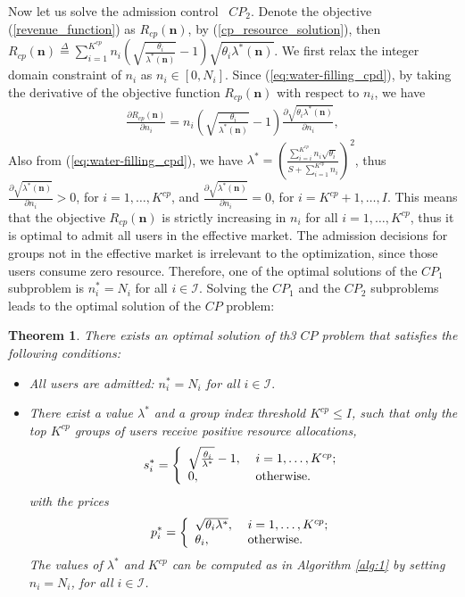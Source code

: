 \documentclass[twocolumn,10pt,twosided]{IEEEtran}
\newtheorem{theorem}{Theorem}
\begin{document}
Now let us solve the admission control ~$CP_2$. Denote the objective  (\ref{revenue_function}) as $R_{cp}(\boldsymbol{n})$, by (\ref{cp_resource_solution}), then $R_{cp}(\boldsymbol{n})\overset{\Delta}{=}\sum\limits_{i=1}^{K^{cp}}\! n_i\!
\left(\! \sqrt{\frac{\theta_i}{\lambda^*(\boldsymbol{n})}}-1 \!\right)\sqrt{\theta_i\lambda^*\!(\boldsymbol{n})}$. We first relax the integer domain constraint of $n_i$ as $n_i\in [0,N_i]$. Since (\ref{eq:water-filling_cpd}), by taking the derivative of the objective function $R_{cp}(\boldsymbol{n})$ with respect to $n_i$, we have
\begin{align}
\label{eq:cp_n}
\frac{\partial R_{cp}(\boldsymbol{n})}{\partial n_i}= n_i \left(\! \sqrt{\frac{\theta_i}{\lambda^*(\boldsymbol{n})}}-1 \!\right)\frac{\partial \sqrt{\theta_i\lambda^*(\boldsymbol{n})}}{\partial n_i},
\end{align}
Also from (\ref{eq:water-filling_cpd}), we have
$\lambda^*\!\! =\!\! \left(\frac{\sum_{i=i}^{K^{cp}} n_i \sqrt {\theta_i}}{S+\sum_{i=1}^{K^{cp}}n_i}\right)^2$,
thus $\frac{\partial \sqrt{\lambda^*(\boldsymbol{n})}}{\partial n_i}>0$, for $i=1,\dots,K^{cp}$, and $\frac{\partial \sqrt{\lambda^*(\boldsymbol{n})}}{\partial n_i}=0$, for $i=K^{cp}+1,\dots,I$. This means that the objective $R_{cp}(\boldsymbol{n})$
is strictly increasing in $n_i$ for all $i=1,\dots,K^{cp}$, thus it is optimal to admit all users in the effective market. The admission decisions for groups not in the effective market is irrelevant to the optimization, since those users consume zero resource. Therefore, one of the optimal solutions of the
$CP_1$ subproblem is $n^*_i=N_i$ for all $ i\in\mathcal{I}$.
Solving the $CP_1$ and the $CP_2$ subproblems  leads to the optimal solution of  the $CP$ problem:
\begin{theorem}\label{thm:opt}
There exists an optimal solution of th3 $CP$ problem that satisfies the following conditions:
\begin{itemize}
    \item All users are admitted: $n^*_i=N_i$ for all $i\in\mathcal{I}.$
    \item There exist a value $\lambda^\ast$ and a group index threshold $K^{cp} \leq I$, such that only the top $K^{cp}$ groups of users receive positive resource allocations,
$$s^*_i= \left\{{\begin{array}{ll}
  \sqrt{\frac{\theta_i}{\lambda^*}}-1, \;& i=1,\dots,K^{cp};\\
  0, & {\rm{otherwise}}.  \\
\end{array}} \right.$$
with the prices
$$
    p^*_i= \left\{{\begin{array}{ll}
  \sqrt{\theta_i\lambda^*}, \; & i=1,\dots,K^{cp};\\
  \theta_i, & {\rm{otherwise}}.  \\
\end{array}} \right.$$
The values of $\lambda^*$ and $K^{cp}$ can be computed as in Algorithm \ref{alg:1} by setting $n_i=N_i$, for all $i\in\mathcal{I}$.
\end{itemize}
\end{theorem}
\end{document}
